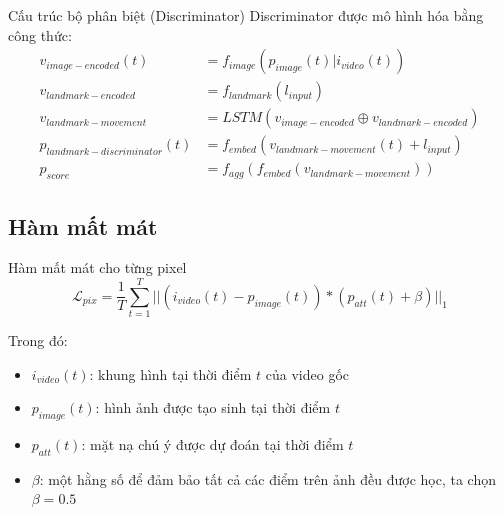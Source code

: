 \begin{frame}{Cấu trúc bộ phân biệt (Discriminator)}
    Discriminator được mô hình hóa bằng công thức:
    \begin{equation}
        \begin{split}
        v_{image-encoded}(t) &= f_{image}(p_{image}(t)|i_{video}(t))\\
        v_{landmark-encoded} &= f_{landmark}(l_{input})\\
        v_{landmark-movement} &= LSTM(v_{image-encoded} \oplus v_{landmark-encoded})\\
        p_{landmark-discriminator}(t) &= f_{embed}(v_{landmark-movement}(t) + l_{input})\\
        p_{score} &= f_{agg}(f_{embed}(v_{landmark-movement}))
        \end{split}
    \end{equation}
\end{frame}

\subsection{Hàm mất mát}

\begin{frame}{Hàm mất mát cho từng pixel}
    \begin{equation}
        \mathcal{L}_{pix} = \frac{1}{T}\sum^T_{t=1}||(i_{video}(t)-p_{image}(t))*(p_{att}(t)+\beta)||_1
    \end{equation}
    
    Trong đó:
    \begin{itemize}
        \item \textbf{$i_{video}(t)$}: khung hình tại thời điểm $t$ của video gốc
        \item \textbf{$p_{image}(t)$}: hình ảnh được tạo sinh tại thời điểm $t$
        \item \textbf{$p_{att}(t)$}: mặt nạ chú ý được dự đoán tại thời điểm $t$
        \item \textbf{$\beta$}: một hằng số để đảm bảo tất cả các điểm trên ảnh đều được học, ta chọn $\beta = 0.5$ 
    \end{itemize}
    
\end{frame}


